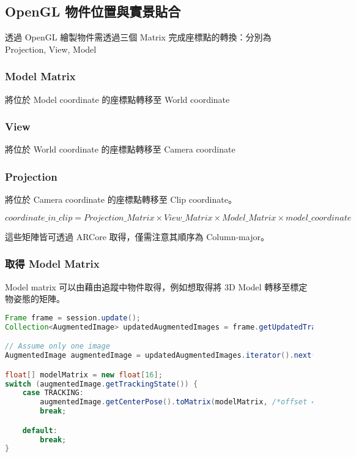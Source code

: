 \subsection{OpenGL 物件位置與實景貼合}

透過 OpenGL 繪製物件需透過三個 Matrix 完成座標點的轉換：分別為 Projection, View, Model

\subsubsection{Model Matrix}
將位於 Model coordinate 的座標點轉移至 World coordinate

\subsubsection{View}
將位於 World coordinate 的座標點轉移至 Camera coordinate

\subsubsection{Projection}
將位於 Camera coordinate 的座標點轉移至 Clip coordinate。

\begin{center}
    $
        coordinate\_in\_clip = Projection\_Matrix \times View\_Matrix \times Model\_Matrix \times model\_coordinate
    $
\end{center}

這些矩陣皆可透過 ARCore 取得，僅需注意其順序為 Column-major。

\subsubsection{取得 Model Matrix}

Model matrix 可以由藉由追蹤中物件取得，例如想取得將 3D Model 轉移至標定物姿態的矩陣。

\begin{lstlisting}[language=Java, caption=將 3D model 的座標空間轉移至以標定物為準的空間]
Frame frame = session.update();
Collection<AugmentedImage> updatedAugmentedImages = frame.getUpdatedTrackables(AugmentedImage.class);

// Assume only one image
AugmentedImage augmentedImage = updatedAugmentedImages.iterator().next();

float[] modelMatrix = new float[16];
switch (augmentedImage.getTrackingState()) {
    case TRACKING:
        augmentedImage.getCenterPose().toMatrix(modelMatrix, /*offset = */ 0);
        break;

    default:
        break;
}
\end{lstlisting}

